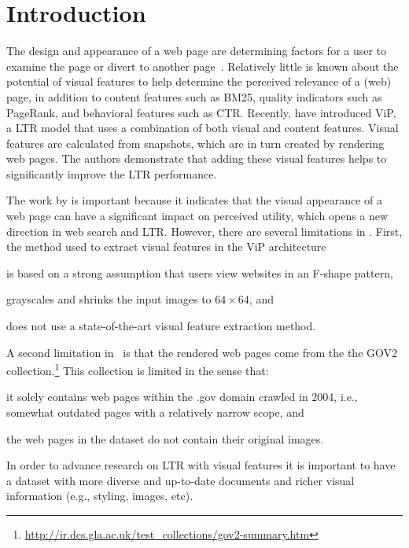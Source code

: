 
\section{Introduction}
The design and appearance of a web page are determining factors for a user to examine the page or divert to another page~\cite{nielsen1999designing,nielsen2006f,pernice2017f,wang2014eye}.
Relatively little is known about the potential of visual features to help determine the perceived relevance of a (web) page, in addition to content features such as BM25, quality indicators such as PageRank, and behavioral features such as CTR.
Recently, \citet{fan2017learning} have introduced ViP, a \ac{LTR} model that uses a combination of both visual and content features.
Visual features are calculated from snapshots, which are in turn created by rendering web pages.
The authors demonstrate that adding these visual features helps to significantly improve the \ac{LTR} performance.

The work by \citet{fan2017learning} is important because it indicates that the visual appearance of a web page can have a significant impact on perceived utility, which opens a new direction in web search and \ac{LTR}.
However, there are several limitations in \cite{fan2017learning}.
First, the method used to extract visual features in the ViP architecture
\begin{inparaenum}[(i)]
\item is based on a strong assumption that users view websites in an F-shape pattern, 
\item grayscales and shrinks the input images to $64\times64$, and
\item does not use a state-of-the-art visual feature extraction method.
\end{inparaenum}

A second limitation in~\citep{fan2017learning} is that
the rendered web pages come from the the GOV2 collection.\footnote{\url{http://ir.dcs.gla.ac.uk/test_collections/gov2-summary.htm}}
This collection is limited in the sense that:
\begin{inparaenum}[(i)]
\item it solely contains web pages within the .gov domain crawled in 2004, i.e., somewhat outdated pages with a relatively narrow scope, and
\item the web pages in the dataset do not contain their original images.
\end{inparaenum}
In order to advance research on \ac{LTR} with visual features it is important to have a dataset with more diverse and up-to-date documents and richer visual information (e.g., styling, images, etc).

